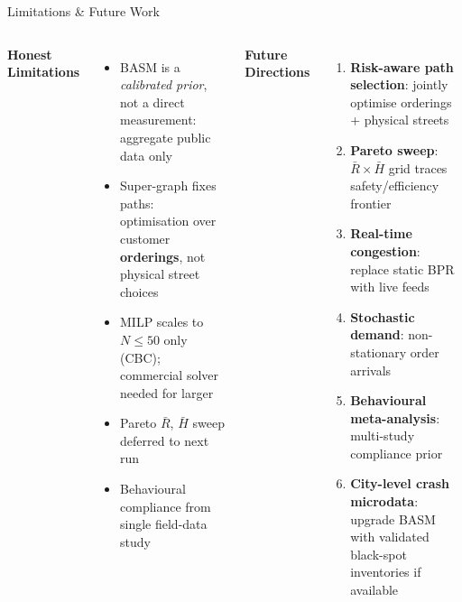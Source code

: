 \documentclass[aspectratio=169,t]{beamer}
\begin{document}
\begin{frame}{Limitations \& Future Work}
\begin{columns}[T]
  \textbf{Honest Limitations}
  \footnotesize
  \begin{itemize}
    \item BASM is a \textit{calibrated prior}, not a direct measurement: aggregate public data only
    \item Super-graph fixes paths: optimisation over customer
          \textbf{orderings}, not physical street choices
    \item MILP scales to $N\leq50$ only (CBC); commercial solver needed for larger
    \item Pareto $\bar{R}$, $\bar{H}$ sweep deferred to next run
    \item Behavioural compliance from single field-data study
  \end{itemize}
  \textbf{Future Directions}
  \footnotesize
  \begin{enumerate}
    \item \textbf{Risk-aware path selection}: jointly optimise orderings + physical streets
    \item \textbf{Pareto sweep}: $\bar{R}\times\bar{H}$ grid traces safety/efficiency frontier
    \item \textbf{Real-time congestion}: replace static BPR with live feeds
    \item \textbf{Stochastic demand}: non-stationary order arrivals
    \item \textbf{Behavioural meta-analysis}: multi-study compliance prior
    \item \textbf{City-level crash microdata}: upgrade BASM with validated black-spot inventories if available
  \end{enumerate}
\end{columns}
\end{frame}
\end{document}
